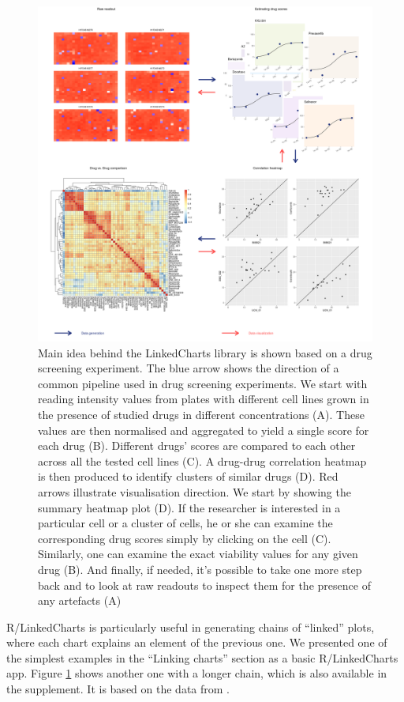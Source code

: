 \documentclass[twocolumn,10pt]{article}
\begin{document}
\begin{figure}[h]
  \includegraphics[width=\textwidth]{FigC/figC.png}
  \caption{Main idea behind the LinkedCharts library is shown based on a drug screening experiment. The blue arrow shows the direction of a common pipeline used in drug screening experiments. We start with reading intensity values from plates with different cell lines grown in the presence of studied drugs in different concentrations (A). These values are then normalised and aggregated to yield a single score for each drug (B). Different drugs' scores are compared to each other across all the tested cell lines (C). A drug-drug correlation heatmap is then produced to identify clusters of similar drugs (D). Red arrows illustrate visualisation direction. We start by showing the summary heatmap plot (D). If the researcher is interested in a particular cell or a cluster of cells, he or she can examine the corresponding drug scores simply by clicking on the cell (C). Similarly, one can examine the exact viability values for any given drug (B). And finally, if needed, it's possible to take one more step back and to look at raw readouts to inspect them for the presence of any artefacts (A)}
  \label{FigC}
\end{figure}

R/LinkedCharts is particularly useful in generating chains of ``linked'' plots, where each chart explains an element of the previous one. We presented one of the simplest examples in the ``Linking charts'' section as a basic R/LinkedCharts app. Figure \ref{FigC} shows another one with a longer chain, which is also available in the supplement. It is based on the data from \citet{he_2018}.
\end{document}
